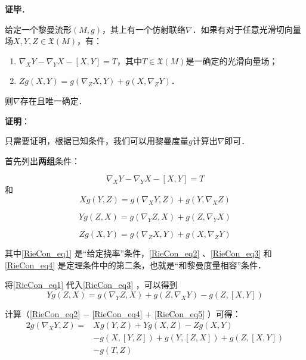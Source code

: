 \textbf{证毕}．






\begin{theorem}{}\label{RieCon_the1}
给定一个黎曼流形$(M, g)$，其上有一个仿射联络$\nabla$．如果有对于任意光滑切向量场$X, Y, Z\in\mathfrak{X}(M)$，有：
\begin{enumerate}
\item $\nabla_XY-\nabla_YX-[X, Y]=T$，其中$T\in \mathfrak{X}(M)$是一确定的光滑向量场；
\item $Zg(X, Y)=g(\nabla_ZX, Y)+g(X, \nabla_ZY)$．
\end{enumerate}
则$\nabla$存在且唯一确定．
\end{theorem}

\textbf{证明}：

只需要证明，根据已知条件，我们可以用黎曼度量$g$计算出$\nabla$即可．

首先列出\textbf{两组}条件：

\begin{equation}\label{RieCon_eq1}
\nabla_XY-\nabla_YX-[X, Y]=T
\end{equation}
和
\begin{equation}\label{RieCon_eq2}
Xg(Y, Z)=g(\nabla_XY, Z)+g(Y, \nabla_XZ)
\end{equation}

\begin{equation}\label{RieCon_eq3}
Yg(Z, X)=g(\nabla_YZ, X)+g(Z, \nabla_YX)
\end{equation}

\begin{equation}\label{RieCon_eq4}
Zg(X, Y)=g(\nabla_ZX, Y)+g(X, \nabla_ZY)
\end{equation}


其中\autoref{RieCon_eq1} 是“给定挠率”条件，\autoref{RieCon_eq2} 、\autoref{RieCon_eq3} 和\autoref{RieCon_eq4} 是定理条件中的第二条，也就是“和黎曼度量相容”条件．

将\autoref{RieCon_eq1} 代入\autoref{RieCon_eq3} ，可以得到
\begin{equation}\label{RieCon_eq5}
Yg(Z, X)=g(\nabla_YZ, X)+g(Z, \nabla_XY)-g(Z, [X, Y])
\end{equation}

计算（\autoref{RieCon_eq2} $-$ \autoref{RieCon_eq4} $+$ \autoref{RieCon_eq5} ）可得：
\begin{equation}
\begin{aligned}
2g(\nabla_XY, Z)=&Xg(Y, Z)+Yg(X, Z)-Zg(X, Y)\\&-g(X, [Y, Z])+g(Y, [Z, X])+g(Z, [X, Y])\\&-g(T, Z)
\end{aligned}
\end{equation}

